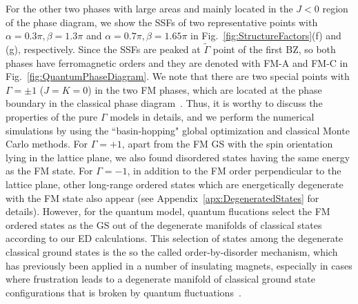 \documentclass[aps,prb,reprint,amsfonts,amsmath,amssymb,showpacs,groupedaddress,superscriptaddress]{revtex4-1}
\begin{document}
For the other two phases with large areas and mainly located in the $J<0$ region of the phase diagram, we show the SSFs of two representative points with $\alpha=0.3\pi, \beta=1.3\pi$ and $\alpha=0.7\pi, \beta=1.65\pi$ in Fig.~\ref{fig:StructureFactors}(f) and (g), respectively. Since the SSFs are peaked at $\tilde{\Gamma}$ point of the first BZ, so both phases have ferromagnetic orders and they are denoted with FM-A and FM-C in Fig.~\ref{fig:QuantumPhaseDiagram}. We note that there are two special points with $\Gamma=\pm1$ ($J=K=0$) in the two FM phases, which are located at the phase boundary in the classical phase diagram~\cite{PhysRevB.92.165108}. Thus, it is worthy to discuss the properties of the pure $\Gamma$ models in details, and we perform the numerical simulations by using the ``basin-hopping" global optimization and classical Monte Carlo methods. For $\Gamma=+1$, apart from the FM GS with the spin orientation lying in the lattice plane, we also found disordered states having the same energy as the FM state. For $\Gamma=-1$, in addition to the FM order perpendicular to the lattice plane, other long-range ordered states which are energetically degenerate with the FM state also appear (see Appendix~\ref{apx:DegeneratedStates} for details). However, for the quantum model, quantum flucations select the FM ordered states as the GS out of the degenerate manifolds of classical states according to our ED calculations. This selection of states among the degenerate classical ground states is the so the called order-by-disorder mechanism, which has previously been applied in a number of insulating magnets, especially in cases where frustration leads to a degenerate manifold of classical ground state configurations that is broken by quantum fluctuations~\cite{JPSJ.54.4494,PhysRevLett.62.2056,PhysRevLett.88.067203,PhysRevB.81.214419,PhysRevLett.109.077204}.
\end{document}
